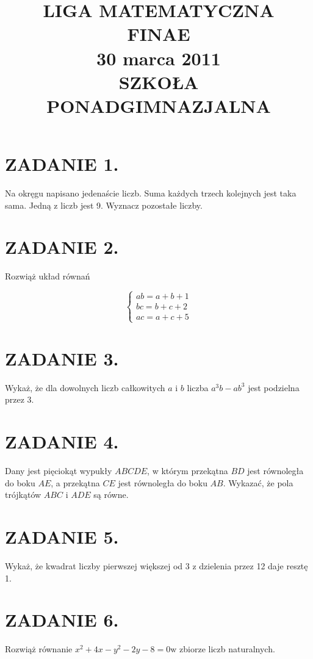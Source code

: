 \documentclass[10pt]{article}
\title{LIGA MATEMATYCZNA \\
 FINAE \\
 30 marca 2011 \\
 SZKOŁA PONADGIMNAZJALNA }
\author{}
\date{}
\begin{document}
\maketitle
\section*{ZADANIE 1.}
Na okręgu napisano jedenaście liczb. Suma każdych trzech kolejnych jest taka sama. Jedną z liczb jest 9. Wyznacz pozostałe liczby.

\section*{ZADANIE 2.}
Rozwiąż układ równań

\[
\left\{\begin{array}{l}
a b=a+b+1 \\
b c=b+c+2 \\
a c=a+c+5
\end{array}\right.
\]

\section*{ZADANIE 3.}
Wykaż, że dla dowolnych liczb całkowitych \(a\) i \(b\) liczba \(a^{3} b-a b^{3}\) jest podzielna przez 3.

\section*{ZADANIE 4.}
Dany jest pięciokąt wypukły \(A B C D E\), w którym przekątna \(B D\) jest równoległa do boku \(A E\), a przekątna \(C E\) jest równoległa do boku \(A B\). Wykazać, że pola trójkątów \(A B C\) i \(A D E\) są równe.

\section*{ZADANIE 5.}
Wykaż, że kwadrat liczby pierwszej większej od 3 z dzielenia przez 12 daje resztę 1.

\section*{ZADANIE 6.}
Rozwiąż równanie \(x^{2}+4 x-y^{2}-2 y-8=0 \mathrm{w}\) zbiorze liczb naturalnych.
\end{document}
